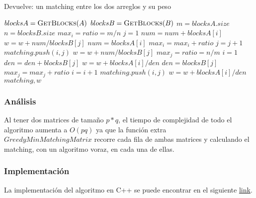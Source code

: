 Devuelve: un matching entre los dos arreglos y su peso
\begin{algorithmic}[1]
  \STATE $blocksA = \textsc{GetBlocks$(A)$}$
  \STATE $blocksB = \textsc{GetBlocks$(B)$}$
  \STATE $m = blocksA.size$
  \STATE $n = blocksB.size$
    \STATE $max_i = ratio = m/n$
    \STATE $j = 1$
            \STATE $num = num + blocksA[i]$
        \ELSE
            \STATE $w = w + num/blocksB[j]$
            \STATE $num = blocksA[i]$
            \STATE $max_i = max_i + ratio$
            \STATE $j = j + 1$
        \ENDIF
        \STATE $matching.push(i,j)$
    \ENDFOR
    \STATE $w = w + num/blocksB[j]$
  \ELSE
    \STATE $max_j = ratio = n/m$
    \STATE $i = 1$
            \STATE $den = den + blocksB[j]$
        \ELSE
            \STATE $w = w + blocksA[i]/den$
            \STATE $den = blocksB[j]$
            \STATE $max_j = max_j + ratio$
            \STATE $i = i + 1$
        \ENDIF
        \STATE $matching.push(i,j)$
    \ENDFOR
    \STATE $w = w + blocksA[i]/den$
  \ENDIF
  \RETURN $matching, w$
\end{algorithmic}
\subsubsection*{Análisis}
Al tener dos matrices de tamaño $p*q$, el tiempo de complejidad de todo el algoritmo aumenta a $O(pq)$ ya que la función extra $GreedyMinMatchingMatrix$ recorre cada fila de ambas matrices y calculando el matching, con un algoritmo voraz, en cada una de ellas.

\subsubsection*{Implementación}
La implementación del algoritmo en C++ se puede encontrar en el siguiente \href{https://github.com/Guillermo598/ProyectoADA/blob/master/Pregunta6.cpp}{link}.